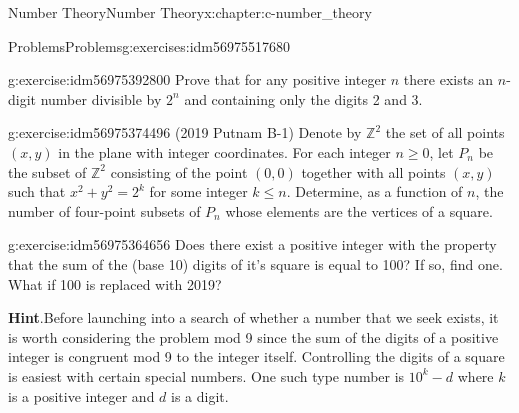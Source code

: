 \documentclass[twoside,10pt,]{book}
\newcommand{\blocktitlefont}{\relax}
\numberwithin{equation}{section}
\begin{document}
\begin{chapterptx}{Number Theory}{}{Number Theory}{}{}{x:chapter:c-number_theory}
\begin{exercises-section}{Problems}{}{Problems}{}{}{g:exercises:idm56975517680}
\begin{divisionexercise}{14}{}{}{g:exercise:idm56975392800}
Prove that for any positive integer \(n\) there exists an \(n\)-digit number divisible by \(2^n\) and containing only the digits 2 and 3.%
\end{divisionexercise}%
\begin{divisionexercise}{15}{}{}{g:exercise:idm56975374496}%
(2019 Putnam B-1) Denote by \(\mathbb{Z}^2\) the set of all points \((x,y)\) in the plane with integer coordinates. For each integer \(n \geq 0\), let \(P_n\) be the subset of \(\mathbb{Z}^2\) consisting of the point \((0,0)\) together with all points \((x,y)\) such that \(x^2 + y^2 = 2^k\) for some integer \(k \leq n\). Determine, as a function of \(n\), the number of four-point subsets of \(P_n\) whose elements are the vertices of a square.%
\end{divisionexercise}%
\begin{divisionexercise}{16}{}{}{g:exercise:idm56975364656}%
Does there exist a positive integer with the property that the sum of the (base 10) digits of it’s square is equal to 100?  If so, find one. What if 100 is replaced with 2019?%
\par\smallskip%
\noindent\textbf{\blocktitlefont Hint}.\hypertarget{g:hint:idm56975359216}{}\quad{}Before launching into a search of whether a number that we seek exists, it is worth considering the problem mod 9 since the sum of the digits of a positive integer is congruent mod 9 to the integer itself.   Controlling the digits of a square is easiest with certain special numbers.   One such type number is \(10^k-d\) where \(k\) is a positive integer and \(d\) is a digit.%
\end{divisionexercise}%
\end{exercises-section}
\end{chapterptx}
%
%
\typeout{************************************************}
\typeout{************************************************}
%
\end{document}
